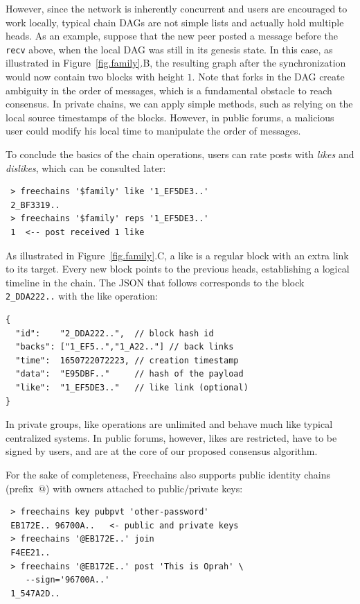 \documentclass[10pt,journal,compsoc]{IEEEtran}
\newcommand{\FC}       {Freechains\xspace}
\newcommand{\code}[1]  {\texttt{\footnotesize{#1}}}
\begin{document}
However, since the network is inherently concurrent and users are encouraged
to work locally, typical chain DAGs are not simple lists and actually hold
multiple heads.
As an example, suppose that the new peer posted a message before the
\code{recv} above, when the local DAG was still in its genesis state.
In this case, as illustrated in Figure~\ref{fig.family}.B, the resulting graph
after the synchronization would now contain two blocks with height $1$.
%
Note that forks in the DAG create ambiguity in the order of messages, which is
a fundamental obstacle to reach consensus.
In private chains, we can apply simple methods, such as relying on the local
source timestamps of the blocks.
However, in public forums, a malicious user could modify his local time to
manipulate the order of messages.

To conclude the basics of the chain operations, users can rate posts with
\emph{likes} and \emph{dislikes}, which can be consulted later:

{\footnotesize
\begin{verbatim}
 > freechains '$family' like '1_EF5DE3..'
 2_BF3319..
 > freechains '$family' reps '1_EF5DE3..'
 1  <-- post received 1 like
\end{verbatim}
}

As illustrated in Figure~\ref{fig.family}.C, a like is a regular block with an
extra link to its target.
Every new block points to the previous heads, establishing a logical timeline
in the chain.
The JSON that follows corresponds to the block \code{2\_DDA222..} with the
like operation:

{\footnotesize
\begin{verbatim}
{
  "id":    "2_DDA222..",  // block hash id
  "backs": ["1_EF5..","1_A22.."] // back links
  "time":  1650722072223, // creation timestamp
  "data":  "E95DBF.."     // hash of the payload
  "like":  "1_EF5DE3.."   // like link (optional)
}
\end{verbatim}
}

In private groups, like operations are unlimited and behave much like typical
centralized systems.
In public forums, however, likes are restricted, have to be signed by users,
and are at the core of our proposed consensus algorithm.

For the sake of completeness, \FC also supports public identity chains
(prefix~$@$) with owners attached to public/private keys:

{\footnotesize
\begin{verbatim}
 > freechains key pubpvt 'other-password'
 EB172E.. 96700A..   <- public and private keys
 > freechains '@EB172E..' join
 F4EE21..
 > freechains '@EB172E..' post 'This is Oprah' \
    --sign='96700A..'
 1_547A2D..
\end{verbatim}
}
\end{document}
